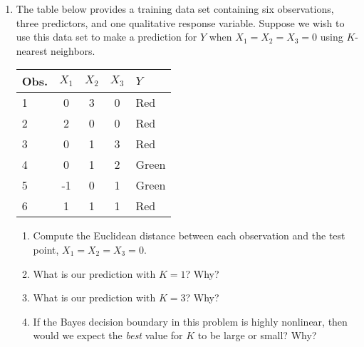 \documentclass[12pt]{article}
\begin{document}
\begin{enumerate}
\item The table below provides a training data set containing six observations,
      three predictors, and one qualitative response variable. Suppose we wish
      to use this data set to make a prediction for $Y$ when $X_1 = X_2 = X_3 = 0$
      using $K$-nearest neighbors.

      \vspace{-1em}

      \begin{table}[h!]
        \begin{center}
          \begin{tabular}{l|cccl}
            Obs. & $X_1$ & $X_2$ & $X_3$ & $Y$ \\
            \hline
            1 & 0   & 3 & 0 & Red\\
            2 & 2   & 0 & 0 & Red\\
            3 & 0   & 1 & 3 & Red\\
            4 & 0   & 1 & 2 & Green\\
            5 & -1  & 0 & 1 & Green\\
            6 & 1   & 1 & 1 & Red
          \end{tabular}
        \end{center}
      \end{table}

      \vspace{-3em}

  \begin{enumerate}
    \item Compute the Euclidean distance between each observation and the test
          point, $X_1 = X_2 = X_3 = 0$.
    \item What is our prediction with $K = 1$? Why?
    \item What is our prediction with $K = 3$? Why?
    \item If the Bayes decision boundary in this problem is highly nonlinear,
          then would we expect the \textit{best} value for $K$ to be large or
          small? Why?
  \end{enumerate}


\end{enumerate}
\end{document}
